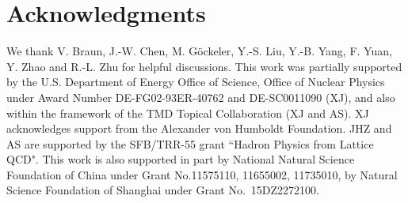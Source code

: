 \section*{Acknowledgments}
We thank V. Braun, J.-W. Chen, M. G\"ockeler, Y.-S. Liu, Y.-B. Yang, F. Yuan, Y. Zhao and R.-L. Zhu for helpful discussions.
This work was partially supported by the U.S. Department of Energy Office of Science, Office of Nuclear Physics under Award Number DE-FG02-93ER-40762 and DE-SC0011090 (XJ), and also within the framework of the TMD Topical Collaboration (XJ and AS). XJ acknowledges support from the Alexander von Humboldt Foundation. JHZ and AS are supported by the SFB/TRR-55 grant ``Hadron Physics from Lattice QCD".  This work is also supported in part by National Natural
Science Foundation of China under Grant
 No.11575110, 11655002, 11735010, by Natural Science Foundation of Shanghai under Grant  No.~15DZ2272100.

